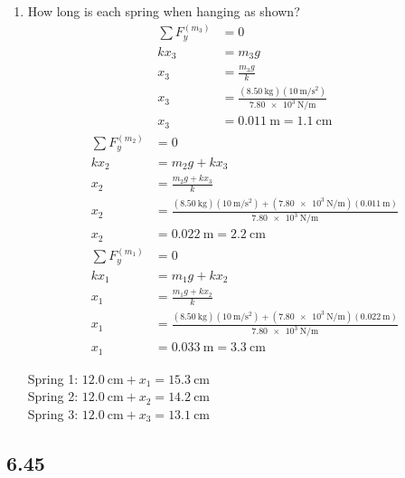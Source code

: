 \documentclass{article}
\begin{document}
\begin{enumerate}[label = \textbf{(\alph*)}]
	\item How long is each spring when hanging as shown?
		\begin{align*}
			\sum F_y^{(m_3)} & = 0 \\
			kx_3 & = m_3g \\
			x_3 & = \frac{m_3g}{k} \\
			x_3 & = \frac{(\SI{8.50}{\kilogram})(\SI{10}{\meter \per \second \squared})}{\SI{7.80e3}{\newton \per \meter}} \\
			x_3 & = \SI{0.011}{\meter} = \SI{1.1}{\centi \meter}
		\end{align*}
		\begin{align*}
			\sum F_y^{(m_2)} & = 0 \\
			kx_2 & = m_2g + kx_3 \\
			x_2 & = \frac{m_2g + kx_3}{k} \\
			x_2 & = \frac{(\SI{8.50}{\kilogram})(\SI{10}{\meter \per \second \squared}) + (\SI{7.80e3}{\newton \per \meter})(\SI{0.011}{\meter})}{\SI{7.80e3}{\newton \per \meter}} \\
			x_2 & = \SI{0.022}{\meter} = \SI{2.2}{\centi \meter}
		\end{align*}
		\begin{align*}
			\sum F_y^{(m_1)} & = 0 \\
			kx_1 & = m_1g + kx_2 \\
			x_1 & = \frac{m_1g + kx_2}{k} \\
			x_1 & = \frac{(\SI{8.50}{\kilogram})(\SI{10}{\meter \per \second \squared}) + (\SI{7.80e3}{\newton \per \meter})(\SI{0.022}{\meter})}{\SI{7.80e3}{\newton \per \meter}} \\
			x_1 & = \SI{0.033}{\meter} = \SI{3.3}{\centi \meter}
		\end{align*}
		\begin{mdframed}
			Spring 1: $ \SI{12.0}{\centi \meter} + x_1 = \SI{15.3}{\centi \meter} $ \\
			Spring 2: $ \SI{12.0}{\centi \meter} + x_2 = \SI{14.2}{\centi \meter} $ \\
			Spring 3: $ \SI{12.0}{\centi \meter} + x_3 = \SI{13.1}{\centi \meter} $
		\end{mdframed}
\end{enumerate}

\subsection{6.45}
\end{document}

